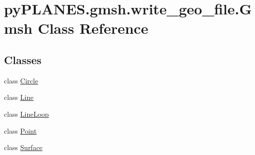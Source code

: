 \hypertarget{classpy_p_l_a_n_e_s_1_1gmsh_1_1write__geo__file_1_1_gmsh}{}\section{py\+P\+L\+A\+N\+E\+S.\+gmsh.\+write\+\_\+geo\+\_\+file.\+Gmsh Class Reference}
\label{classpy_p_l_a_n_e_s_1_1gmsh_1_1write__geo__file_1_1_gmsh}
\subsection*{Classes}
\begin{DoxyCompactItemize}
\item 
class \mbox{\hyperlink{classpy_p_l_a_n_e_s_1_1gmsh_1_1write__geo__file_1_1_gmsh_1_1_circle}{Circle}}
\item 
class \mbox{\hyperlink{classpy_p_l_a_n_e_s_1_1gmsh_1_1write__geo__file_1_1_gmsh_1_1_line}{Line}}
\item 
class \mbox{\hyperlink{classpy_p_l_a_n_e_s_1_1gmsh_1_1write__geo__file_1_1_gmsh_1_1_line_loop}{Line\+Loop}}
\item 
class \mbox{\hyperlink{classpy_p_l_a_n_e_s_1_1gmsh_1_1write__geo__file_1_1_gmsh_1_1_point}{Point}}
\item 
class \mbox{\hyperlink{classpy_p_l_a_n_e_s_1_1gmsh_1_1write__geo__file_1_1_gmsh_1_1_surface}{Surface}}
\end{DoxyCompactItemize}
